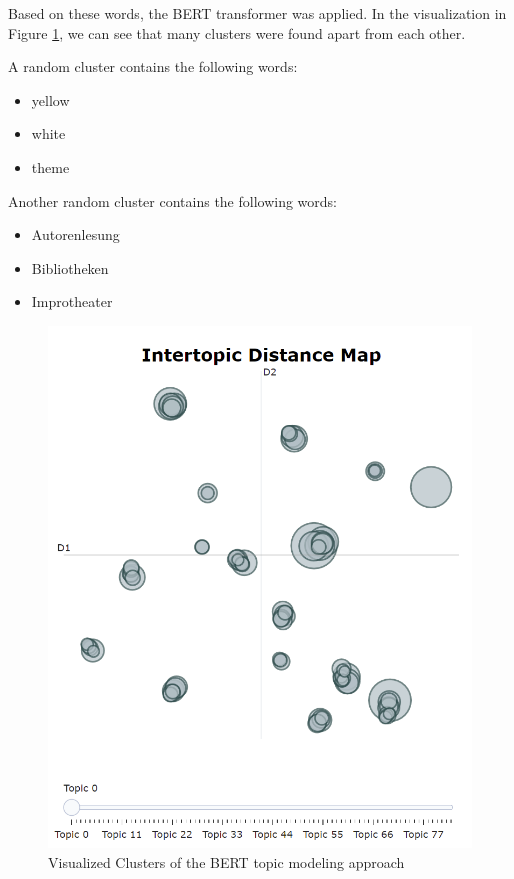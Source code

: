 \documentclass[conference]{IEEEtran}
\begin{document}
Based on these words, the BERT transformer was applied. In the visualization in Figure \ref{fig:bert_example}, we can see that many clusters were found apart from each other.

A random cluster contains the following words:

\begin{itemize}
\item yellow
\item white
\item theme
\end{itemize} 

Another random cluster contains the following words:

\begin{itemize}
\item Autorenlesung
\item Bibliotheken
\item Improtheater
\end{itemize}

\begin{figure}
\centering
\includegraphics[width=1\linewidth]{../Imgs/bert_map}
\caption{Visualized Clusters of the BERT topic modeling approach}
\label{fig:bert_example}
\end{figure}
\end{document}
